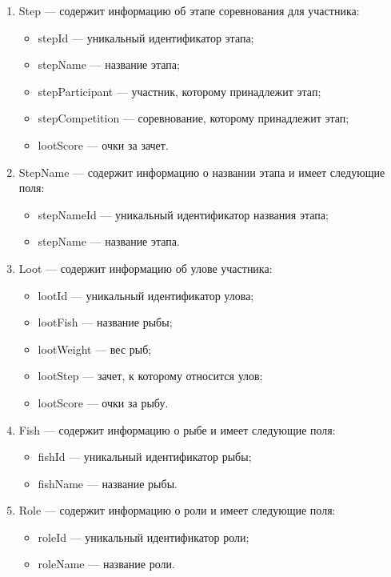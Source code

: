 \begin{enumerate}
	\item Step --- содержит информацию об этапе соревнования для участника:
	\begin{itemize}[label=---]
		\item stepId --- уникальный идентификатор этапа;
		\item stepName --- название этапа;
		\item stepParticipant --- участник, которому принадлежит этап; 
		\item stepCompetition --- соревнование, которому принадлежит этап; 
		\item lootScore --- очки за зачет.
	\end{itemize}
	
	\item StepName --- содержит информацию о названии этапа и имеет следующие поля:
	\begin{itemize}[label=---]
		\item stepNameId --- уникальный идентификатор названия этапа;
		\item stepName --- название  этапа.
	\end{itemize}	
	
	\item Loot --- содержит информацию об улове участника:
	\begin{itemize}[label=---]
		\item lootId --- уникальный идентификатор улова;
		\item lootFish --- название рыбы;
		\item lootWeight --- вес рыб;
		\item lootStep --- зачет, к которому относится улов;
		\item lootScore --- очки за рыбу.
	\end{itemize}
	
	\item Fish --- содержит информацию о рыбе и имеет следующие поля:
	\begin{itemize}[label=---]
		\item fishId --- уникальный идентификатор рыбы;
		\item fishName --- название  рыбы.
	\end{itemize}	
	
	\item Role --- содержит информацию о роли и имеет следующие поля:
	\begin{itemize}[label=---]
		\item roleId --- уникальный идентификатор роли;
		\item roleName --- название  роли.
	\end{itemize}	
	

\end{enumerate}

